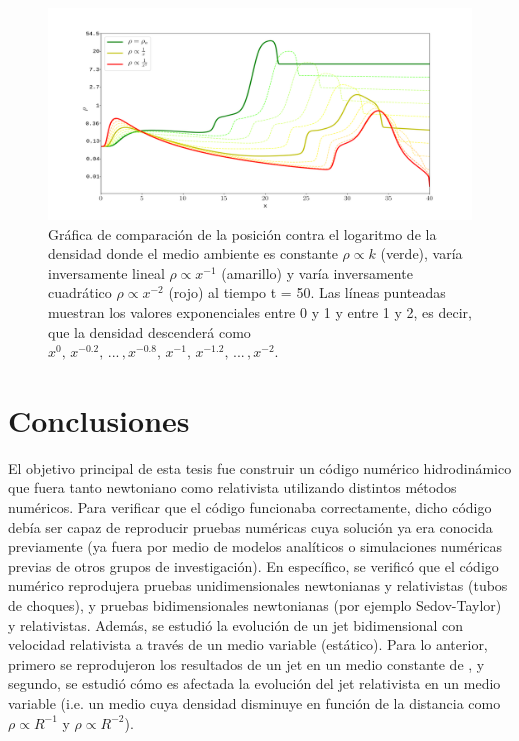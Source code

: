 \documentclass[12pt,a4paper]{book}
\begin{document}
\begin{figure}
  \centering
    \includegraphics[width=1\textwidth]{./Figuras/jet/perfiles/densidades_comparacion.png}
  \caption{Gráfica de comparación de la posición contra el logaritmo de la densidad 
  donde el medio ambiente es constante $\rho \varpropto k$ (verde), varía inversamente lineal
  $\rho \varpropto x^{-1}$ (amarillo) y varía inversamente cuadrático $\rho \varpropto x^{-2}$ (rojo)
  al tiempo t = 50.  Las líneas punteadas muestran los valores exponenciales entre 0 y 1 y entre 1 y 2,
  es decir, que la densidad descenderá como $x^0, \, x^{-0.2}, \, . . . \,  ,x^{-0.8} , \, x^{-1}  , \, x^{-1.2}
  , \, . . . \,  , x^{-2}$.}\label{fig:perfiles_comparacion_jet}
\end{figure}

\chapter{Conclusiones}
El objetivo principal de esta tesis fue construir un código numérico hidrodinámico que fuera tanto newtoniano como relativista utilizando distintos métodos numéricos. Para verificar que el código 
funcionaba correctamente, dicho código debía ser capaz de reproducir pruebas numéricas cuya solución ya era conocida previamente (ya fuera por medio de modelos analíticos o simulaciones numéricas previas de otros 
grupos de investigación). En específico, se verificó que el código numérico reprodujera pruebas unidimensionales newtonianas y relativistas (tubos de choques), y pruebas bidimensionales newtonianas 
(por ejemplo Sedov-Taylor) y relativistas. Además, se estudió la evolución de un jet bidimensional con velocidad relativista a través de un medio variable (estático). Para lo anterior, primero se reprodujeron los 
resultados de un jet en un medio constante de 
\citet{MB-HLLC-I}, y segundo, se estudió cómo es afectada la evolución del jet relativista en un medio variable (i.e. un medio cuya densidad disminuye en función de la distancia como 
$\rho \propto R^{-1}$ y $\rho \propto R^{-2}$).
\end{document}
